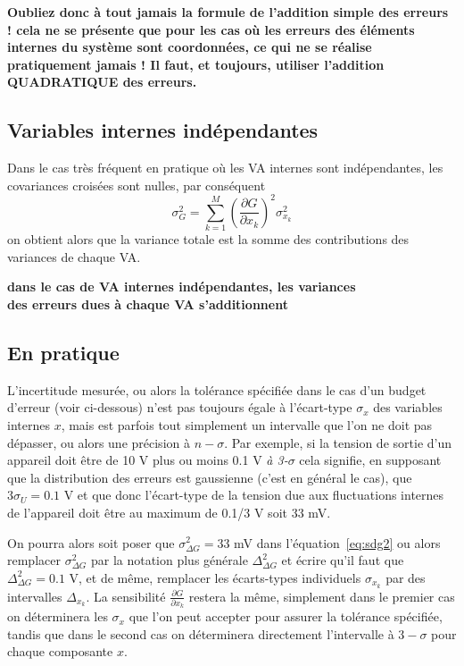 \begin{center}
    \bf Oubliez donc à tout jamais la formule de l'addition simple des erreurs ! cela ne se présente que pour les cas où les erreurs des éléments internes du système sont coordonnées, ce qui ne se réalise pratiquement jamais ! Il faut, et toujours, utiliser l'addition QUADRATIQUE des erreurs.
\end{center}

\subsection{Variables internes indépendantes}

Dans le cas très fréquent en pratique où les VA internes sont indépendantes, les covariances croisées sont nulles, par conséquent
\begin{equation}
    \sigma^2_G=\sum\limits_{k=1}^{M}\left(\frac{\partial G}{\partial x_k}\right)^2\sigma_{x_k}^2
    \label{eq:vardlcolvisd}
\end{equation}
on obtient alors que la variance totale est la somme des contributions des variances de chaque VA.
\begin{center}
    \bf
    dans le cas de VA internes indépendantes, les variances\\
    des erreurs dues à chaque VA s'additionnent
\end{center}

\subsection{En pratique}

L'incertitude mesurée, ou alors la tolérance spécifiée dans le cas d'un budget d'erreur (voir ci-dessous) n'est pas toujours égale à l'écart-type $\sigma_x$ des variables internes $x$, mais est parfois tout simplement un intervalle que l'on ne doit pas dépasser, ou alors une précision à $n-\sigma$. Par exemple, si la tension de sortie d'un appareil doit être de 10 V plus ou moins 0.1 V \textit{à 3-$\sigma$} cela signifie, en supposant que la distribution des erreurs est gaussienne (c'est en général le cas), que $3\sigma_U=0.1$ V et que donc l'écart-type de la tension due aux fluctuations internes de l'appareil doit être au maximum de 0.1/3 V soit 33 mV.

On pourra alors soit poser que $\sigma^2_{\Delta G}=33$ mV dans l'équation~\ref{eq:sdg2} ou alors remplacer $\sigma^2_{\Delta G}$ par la notation plus générale $\Delta^2_{\Delta G}$ et écrire qu'il faut que $\Delta^2_{\Delta G}=0.1$ V, et de même, remplacer les écarts-types individuels $\sigma_{x_k}$ par des intervalles $\Delta_{x_k}$. La sensibilité $\frac{\partial G}{\partial x_k}$ restera la même, simplement dans le premier cas on déterminera les $\sigma_x$ que l'on peut accepter pour assurer la tolérance spécifiée, tandis que dans le second cas on déterminera directement l'intervalle à $3-\sigma$ pour chaque composante $x$.

